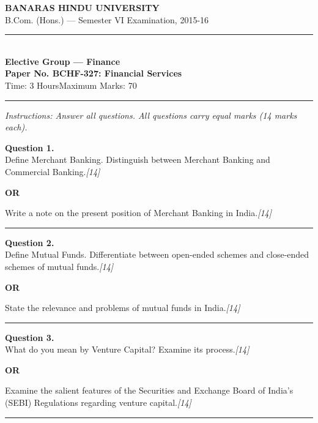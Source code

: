 \documentclass[11pt,a4paper]{article}
\newcommand{\pts}[1]{\hfill   \textit{[#1]}}
\begin{document}
\begin{center}
  {\large\bfseries BANARAS HINDU UNIVERSITY}\\[2pt]
  {\normalsize B.Com. (Hons.) --- Semester VI Examination, 2015-16}\\[6pt]
  \rule{0.8\linewidth}{0.5pt}\\[6pt]
  {\large\bfseries Elective Group --- Finance}\\[4pt]
  {\large\bfseries Paper No. BCHF-327: Financial Services}\\[4pt]
  {\normalsize Time: 3 Hours\hfill Maximum Marks: 70}
\end{center}

\rule{\linewidth}{0.4pt}

\smallskip



\noindent   \textit{Instructions: Answer all questions. All questions carry equal marks (14 marks each).}

\bigskip




\noindent   \textbf{Question 1.} \\
Define Merchant Banking. Distinguish between Merchant Banking and Commercial Banking.\pts{14}

\centerline{   \textbf{OR}}

Write a note on the present position of Merchant Banking in India.\pts{14}

\medskip\rule{\linewidth}{0.2pt}




\noindent   \textbf{Question 2.} \\
Define Mutual Funds. Differentiate between open-ended schemes and close-ended schemes of mutual funds.\pts{14}

\centerline{   \textbf{OR}}

State the relevance and problems of mutual funds in India.\pts{14}

\medskip\rule{\linewidth}{0.2pt}

\pagebreak




\noindent   \textbf{Question 3.} \\
What do you mean by Venture Capital? Examine its process.\pts{14}

\centerline{   \textbf{OR}}

Examine the salient features of the Securities and Exchange Board of India's (SEBI) Regulations regarding venture capital.\pts{14}

\medskip\rule{\linewidth}{0.2pt}
\end{document}
